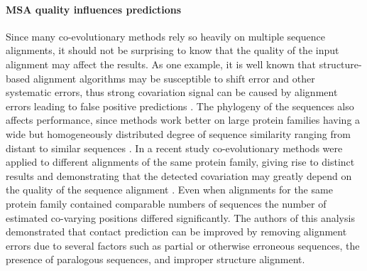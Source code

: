 \paragraph{MSA quality influences predictions}
Since many co-evolutionary methods rely so heavily on multiple sequence alignments, it should not be surprising to know that the quality of the input alignment may affect the results.
As one example, it is well known that structure-based alignment algorithms may be susceptible to shift error and other systematic errors, thus strong covariation signal can be caused by alignment errors leading to false positive predictions \cite{dickson2010identifying}.
The phylogeny of the sequences also affects performance, since methods work better on large protein families having a wide but homogeneously distributed degree of sequence similarity ranging from distant to similar sequences \cite{de2013emerging}.
In a recent study co-evolutionary methods were applied to different alignments of the same protein family, giving rise to distinct results and demonstrating that the detected covariation may greatly depend on the quality of the sequence alignment \cite{dickson2010identifying}.
Even when alignments for the same protein family contained comparable numbers of sequences the number of estimated co-varying positions differed significantly.
The authors of this analysis demonstrated that contact prediction can be improved by removing alignment errors due to several factors such as partial or otherwise erroneous sequences, the presence of paralogous sequences, and improper structure alignment.

